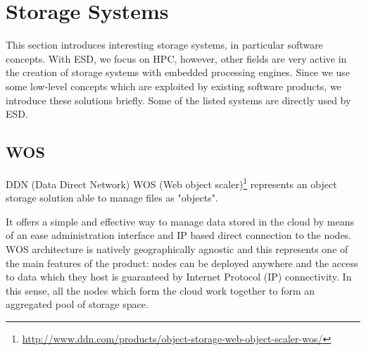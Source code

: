 \section{Storage Systems}
\label{sec: background/storage systems}

This section introduces interesting storage systems, in particular software concepts.
With ESD, we focus on HPC, however, other fields are very active in the creation of storage systems with embedded processing engines.
Since we use some low-level concepts which are exploited by existing software products, we introduce these solutions briefly.
Some of the listed systems are directly used by ESD.

\subsection{WOS}
\label{WOS background}

DDN (Data Direct Network) WOS (Web object scaler)\footnote{\url{http://www.ddn.com/products/object-storage-web-object-scaler-wos/}} represents an object storage solution able to manage files as "objects".

It offers a simple and effective way to manage data stored in the cloud by means of an ease administration interface and IP based direct connection to the nodes.
WOS architecture is natively geographically agnostic and this represents one of the main features of the product: nodes can be deployed anywhere and the access to data which they host is guaranteed by Internet Protocol (IP) connectivity.
In this sense, all the nodes which form the cloud work together to form an aggregated pool of storage space.


